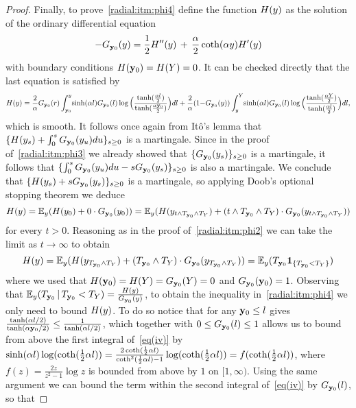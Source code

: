 \begin{proof}
Finally, to prove~\eqref{radial:itm:phi4} define the function $H(y)$ as the solution of the ordinary differential equation
\[-G_{{\bf y}_0}(y) = \frac{1}{2}H''(y)\,+\,\frac{\alpha}{2}\operatorname{coth}(\alpha y)H'(y)\]
with boundary conditions $H({\bf y}_0)=H(Y)=0$. It can be checked directly that the last equation is satisfied by
{\footnotesize
\begin{equation}\label{eq(iv)}
H(y)=\frac{2}{\alpha}G_{{\bf y}_0}(r)\int_{{\bf y}_0}^{y}\!\sinh(\alpha l)G_{{\bf y}_0}(l)\log\Big(\frac{\tanh(\frac{\alpha l}{2})}{\tanh(\frac{\alpha {\bf y}_0}{2})}\Big)dl+\frac{2}{\alpha}(1{-}G_{{\bf y}_0}(y))\int_{y}^Y\!\sinh(\alpha l)G_{{\bf y}_0}(l)\log\Big(\frac{\tanh(\frac{\alpha Y}{2})}{\tanh(\frac{\alpha l}{2})}\Big)dl,
\end{equation}}
which is smooth. It follows once again from Itô's lemma that $\{H(y_s)+\int_0^s G_{{\bf y}_0}(y_u)du\}_{s \ge 0}$ is a martingale. Since in the proof of~\eqref{radial:itm:phi3} we already showed that $\{G_{{\bf y}_0}(y_s)\}_{s \ge 0}$ is a martingale, it follows that $\{\int_0^s G_{{\bf y}_0}(y_u)du-s G_{{\bf y}_0}(y_s)\}_{s \ge 0}$ is also a martingale. We conclude that $\{H(y_s)+s G_{{\bf y}_0}(y_s)\}_{s \ge 0}$ is a martingale, so applying Doob's optional stopping theorem we deduce
\[H(y)=\mathbb{E}_{y}(H(y_0)+0\cdot G_{{\bf y}_0}(y_0))=\mathbb{E}_{y}(H(y_{t\wedge T_{{\bf y}_0}\wedge T_{Y}})+(t\wedge T_{{\bf y}_0}\wedge T_{Y})\cdot G_{{\bf y}_0}(y_{t\wedge T_{{\bf y}_0}\wedge T_{Y}}))\]
for every $t>0$. Reasoning as in the proof of~\eqref{radial:itm:phi2} we can take the limit as $t\to\infty$ to obtain
\[H(y)=\mathbb{E}_{y}(H(y_{T_{{\bf y}_0}\wedge T_{Y}})+(T_{{\bf y}_0}\wedge T_{Y})\cdot G_{{\bf y}_0}(y_{T_{{\bf y}_0}\wedge T_{Y}}))=\mathbb{E}_{y}(T_{{\bf y}_0}{\bf1}_{\{T_{{\bf y}_0}<T_{Y}\}})\]
where we used that $H({\bf y}_0)=H(Y)=G_{{\bf y}_0}(Y)=0$ and $G_{{\bf y}_0}({\bf y}_0)=1$. Observing that $\mathbb{E}_{y}(T_{{\bf y}_0}\,|\,T_{{\bf y}_0}<T_Y)=\frac{H(y)}{G_{{\bf y}_0}(y)}$, to obtain the inequality in~\eqref{radial:itm:phi4} we only need to bound $H(y)$. To do so notice that for any ${\bf y}_0\leq l$ gives $\frac{\tanh(\alpha l/2)}{\tanh(\alpha {\bf y}_0/2)}\leq \frac{1}{\tanh(\alpha l/2)}$, which together with $0\leq G_{{\bf y}_0}(l)\leq 1$ allows us to bound from above the first integral of~\eqref{eq(iv)} by $\sinh(\alpha l)\log(\operatorname{coth}(\frac12\alpha l))=\frac{2\operatorname{coth}(\frac12\alpha l)}{\operatorname{coth}^2(\frac12\alpha l)-1}\log (\operatorname{coth}(\frac12\alpha l))=f(\operatorname{coth}(\frac12\alpha l))$, where $f(z)=\frac{2z}{z^2-1}\log z$ is bounded from above by $1$ on $[1,\infty)$. Using the same argument we can bound the term within the second integral of~\eqref{eq(iv)} by $G_{{\bf y}_0}(l)$, so that

\end{proof}
